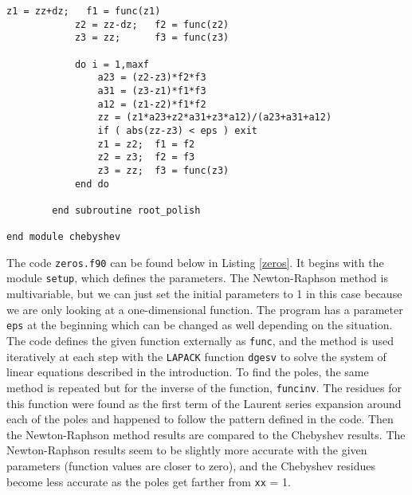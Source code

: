 \documentclass[12pt]{article}
\begin{document}
\begin{lstlisting}[frame=single,caption={Module {\tt cheby.f90}},label=cheby2]
            z1 = zz+dz;   f1 = func(z1)
            z2 = zz-dz;   f2 = func(z2)
            z3 = zz;      f3 = func(z3)

            do i = 1,maxf
                a23 = (z2-z3)*f2*f3
                a31 = (z3-z1)*f1*f3
                a12 = (z1-z2)*f1*f2
                zz = (z1*a23+z2*a31+z3*a12)/(a23+a31+a12)
                if ( abs(zz-z3) < eps ) exit
                z1 = z2;  f1 = f2
                z2 = z3;  f2 = f3
                z3 = zz;  f3 = func(z3)
            end do
        
        end subroutine root_polish
      
end module chebyshev

\end{lstlisting}

The code {\tt zeros.f90} can be found below in Listing \ref{zeros}.  It begins with the module {\tt setup}, which defines the parameters.  The Newton-Raphson method is multivariable, but we can just set the initial parameters to 1 in this case because we are only looking at a one-dimensional function.  The program has a parameter {\tt eps} at the beginning which can be changed as well depending on the situation.  The code defines the given function externally as {\tt func}, and the method is used iteratively at each step with the {\tt LAPACK} function {\tt dgesv} to solve the system of linear equations described in the introduction.  To find the poles, the same method is repeated but for the inverse of the function, {\tt funcinv}.  The residues for this function were found as the first term of the Laurent series expansion around each of the poles and happened to follow the pattern defined in the code.  Then the Newton-Raphson method results are compared to the Chebyshev results.  The Newton-Raphson results seem to be slightly more accurate with the given parameters (function values are closer to zero), and the Chebyshev residues become less accurate as the poles get farther from {\tt xx} = 1.
\end{document}
